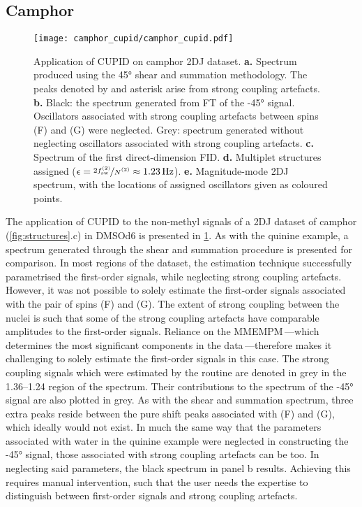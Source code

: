 \subsection{Camphor}
\begin{figure}%
    \centering%
    \texttt{[image: camphor\_cupid/camphor\_cupid.pdf]}%
    \caption[
        Application of \acs{CUPID} on a camphor dataset.
    ]{
        Application of \acs{CUPID} on camphor \ac{2DJ} dataset.
        \textbf{a.} Spectrum produced using the \ang{45} shear and summation
        methodology. The peaks denoted by and asterisk arise from strong
        coupling artefacts.
        \textbf{b.} Black: the spectrum generated from \ac{FT} of the \ang{-45}
        signal. Oscillators associated with strong coupling artefacts between
        spins (F) and (G) were neglected. Grey: spectrum generated without
        neglecting oscillators associated with strong coupling artefacts.
        \textbf{c.} Spectrum of the first direct-dimension \ac{FID}.
        \textbf{d.} Multiplet structures assigned ($\epsilon =
        \nicefrac{2 \fswtwo}{\Ntwo} \approx \qty{1.23}{\hertz}$).
        \textbf{e.} Magnitude-mode \acs{2DJ} spectrum, with the locations of
        assigned oscillators given as coloured points.
    }
    \label{fig:camphor-cupid}%
\end{figure}%
The application of \ac{CUPID} to the non-methyl signals of a \ac{2DJ}
dataset of camphor (\cref{fig:structures}.c) in \acs{DMSOd6} is presented
in \cref{fig:camphor-cupid}. As with the quinine example, a spectrum
generated through the shear and summation procedure is presented for
comparison. In most regions of the dataset, the estimation technique
successfully parametrised the first-order signals, while neglecting strong
coupling artefacts. However, it was not possible to solely estimate the
first-order signals associated with the pair of spins (F) and (G). The extent
of strong coupling between the nuclei is such that some of the strong coupling
artefacts have comparable amplitudes to the first-order signals. Reliance on
the
\ac{MMEMPM}\,---which determines the most significant components in
the data\,---therefore makes it challenging to solely estimate the first-order
signals in this case. The strong coupling signals which were estimated by the
routine are denoted in grey in the \SIrange{1.36}{1.24}{\partspermillion} region
of the spectrum. Their contributions to the spectrum of the \ang{-45} signal
are also plotted in grey. As with the shear and summation spectrum, three extra
peaks reside between the pure shift peaks associated with (F) and (G), which
ideally would not exist. In much the same way that the parameters associated
with water in the quinine example were neglected in constructing the \ang{-45}
signal, those associated with strong coupling artefacts can be too.
In neglecting said parameters, the black spectrum in panel b
results. Achieving this requires manual intervention, such that the user needs
the expertise to distinguish between first-order signals and strong coupling
artefacts.

